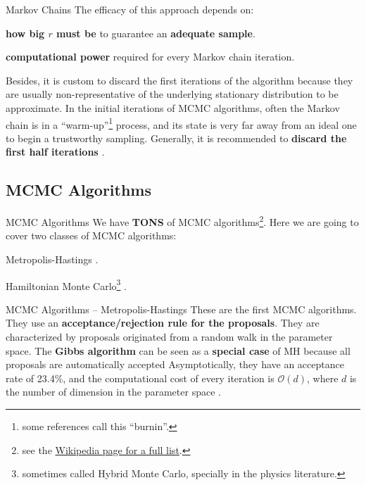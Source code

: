 \begin{frame}{Markov Chains}
	The efficacy of this approach depends on:
	\begin{vfilleditems}
		\item \textbf{how big $r$ must be} to guarantee an \textbf{adequate sample}.
		\item \textbf{computational power} required for every Markov chain iteration.
	\end{vfilleditems}

	\vfill
	\footnotesize
	Besides, it is custom to discard the first iterations of the algorithm because
	they are usually non-representative of the underlying stationary distribution to be approximate.
	In the initial iterations of MCMC algorithms,
	often the Markov chain is in a ``warm-up''\footnote{some references call this ``burnin''.} process,
	and its state is very far away from an ideal one to begin a trustworthy sampling.
	\vfill
	Generally, it is recommended to \textbf{discard the first half iterations} \parencite{gelmanBasicsMarkovChain2013}.
\end{frame}

\subsection{MCMC Algorithms}
\begin{frame}{MCMC Algorithms}
	We have \textbf{TONS} of MCMC algorithms\footnote{see the \href{https://en.wikipedia.org/wiki/Markov_chain_Monte_Carlo}
		{Wikipedia page for a full list}.}.
	Here we are going to cover two classes of MCMC algorithms:
	\begin{vfilleditems}
		\item Metropolis-Hastings \parencite{metropolisEquationStateCalculations1953, hastingsMonteCarloSampling1970}.

		\item Hamiltonian Monte Carlo\footnote{sometimes called Hybrid Monte Carlo, specially in the physics literature.} \parencite{neal2011mcmc, betancourtConceptualIntroductionHamiltonian2017}.
	\end{vfilleditems}
\end{frame}

\begin{frame}{MCMC Algorithms -- Metropolis-Hastings}
	These are the first MCMC algorithms.
	They use an \textbf{acceptance/rejection rule for the proposals}.
	They are characterized by proposals originated from a random walk in the parameter space.
	The \textbf{Gibbs algorithm} can be seen as a \textbf{special case} of MH
	because all proposals are automatically accepted \parencite{gelmanIterativeNonIterativeSimulation1992}
	\vfill
	Asymptotically, they have an acceptance rate of 23.4\%,
	and the computational cost of every iteration is $\mathcal{O}(d)$,
	where $d$ is the number of dimension in the parameter space \parencite{beskosOptimalTuningHybrid2013}.
\end{frame}


